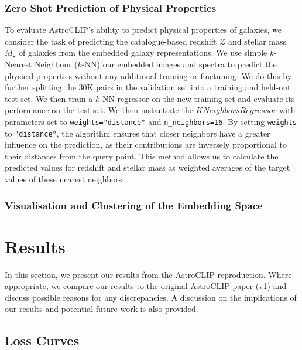 \documentclass[a4paper,12pt]{article}
\begin{document}
\subsubsection*{Zero Shot Prediction of Physical Properties}
To evaluate AstroCLIP's ability to predict physical properties of galaxies, we consider the task of predicting the catalogue-based redshift $\mathcal{Z}$ and stellar mass $M_{\star}$ of galaxies from the embedded galaxy representations. We use simple $k$-Nearest Neighbour ($k$-NN) our embedded images and spectra to predict the physical properties without any additional training or finetuning.  We do this by further splitting the 30K pairs in the validation set into a training and held-out test set. We then train a $k$-NN regressor on the new training set and evaluate its performance on the test set. We then instantiate the $KNeighborsRegressor$ with parameters set to \texttt{weights="distance"} and \texttt{n\_neighbors=16}. By setting \texttt{weights} to \texttt{"distance"}, the algorithm ensures that closer neighbors have a greater influence on the prediction, as their contributions are inversely proportional to their distances from the query point. This method allows us to calculate the predicted values for redshift and stellar mass as weighted averages of the target values of these nearest neighbors.

\subsubsection*{Visualisation and Clustering of the Embedding Space}


\section{Results}
In this section, we present our results from the AstroCLIP reproduction. Where appropriate, we compare our results to the original AstroCLIP paper (v1) \cite{astroclip} and discuss possible reasons for any discrepancies. A discussion on the implications of our results and potential future work is also provided.

\subsection{Loss Curves}
\end{document}
